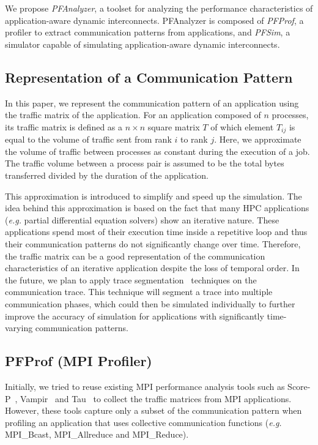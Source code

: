 We propose \emph{PFAnalyzer}, a toolset for analyzing the performance
characteristics of application-aware dynamic interconnects. PFAnalyzer
is composed of \emph{PFProf}, a profiler to extract communication
patterns from applications, and \emph{PFSim}, a simulator capable of
simulating application-aware dynamic interconnects.

\subsection{Representation of a Communication Pattern}

In this paper, we represent the communication pattern of an application
using the traffic matrix of the application. For an application composed
of \(n\) processes, its traffic matrix is defined as a \(n \times n\)
square matrix \(T\) of which element \(T_{ij}\) is equal to the volume
of traffic sent from rank \(i\) to rank \(j\). Here, we approximate the
volume of traffic between processes as constant during the execution of
a job. The traffic volume between a process pair is assumed to be the
total bytes transferred divided by the duration of the application.

This approximation is introduced to simplify and speed up the
simulation. The idea behind this approximation is based on the fact that
many HPC applications (\emph{e.g.} partial differential equation
solvers) show an iterative nature. These applications spend most of
their execution time inside a repetitive loop and thus their
communication patterns do not significantly change over time. Therefore,
the traffic matrix can be a good representation of the communication
characteristics of an iterative application despite the loss of temporal
order. In the future, we plan to apply trace
segmentation~\autocite{Alawneh2016} techniques on the communication
trace. This technique will segment a trace into multiple communication
phases, which could then be simulated individually to further improve
the accuracy of simulation for applications with significantly
time-varying communication patterns.

\subsection{PFProf (MPI Profiler)}\label{ii-pfprof}

Initially, we tried to reuse existing MPI performance analysis tools
such as \mbox{Score-P}~\autocite{Knupfer2012},
Vampir~\autocite{Knupfer2008} and Tau~\autocite{Shende2006} to collect
the traffic matrices from MPI applications. However, these tools capture
only a subset of the communication pattern when profiling an application
that uses collective communication functions (\emph{e.g.} MPI\_Bcast,
MPI\_Allreduce and MPI\_Reduce).


